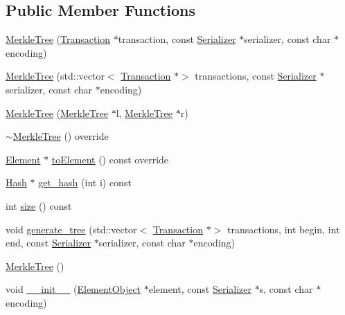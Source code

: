 \subsection*{Public Member Functions}
\begin{DoxyCompactItemize}
\item 
\mbox{\hyperlink{classMerkleTree_a257abaf20fa542b29dfdab95294ae578}{Merkle\+Tree}} (\mbox{\hyperlink{classTransaction}{Transaction}} $\ast$transaction, const \mbox{\hyperlink{classSerializer}{Serializer}} $\ast$serializer, const char $\ast$encoding)
\item 
\mbox{\hyperlink{classMerkleTree_abc65d820b1b59f00350b2f4a4bc580bd}{Merkle\+Tree}} (std\+::vector$<$ \mbox{\hyperlink{classTransaction}{Transaction}} $\ast$$>$ transactions, const \mbox{\hyperlink{classSerializer}{Serializer}} $\ast$serializer, const char $\ast$encoding)
\item 
\mbox{\hyperlink{classMerkleTree_a361a5f238249d4893b000560dcabacde}{Merkle\+Tree}} (\mbox{\hyperlink{classMerkleTree}{Merkle\+Tree}} $\ast$l, \mbox{\hyperlink{classMerkleTree}{Merkle\+Tree}} $\ast$r)
\item 
\mbox{\hyperlink{classMerkleTree_a3f27e1251262e736106a9a2fba75f72f}{$\sim$\+Merkle\+Tree}} () override
\item 
\mbox{\hyperlink{classElement}{Element}} $\ast$ \mbox{\hyperlink{classMerkleTree_a4e72819c6cbc49ed8ce092f464711a5f}{to\+Element}} () const override
\item 
\mbox{\hyperlink{classHash}{Hash}} $\ast$ \mbox{\hyperlink{classMerkleTree_a74d741770514ec323521ec6d79d250f2}{get\+\_\+hash}} (int i) const
\item 
int \mbox{\hyperlink{classMerkleTree_aac309360fa4653451af713a8ce9684bd}{size}} () const
\item 
void \mbox{\hyperlink{classMerkleTree_a543fdfd1f1c4ded332cdeae2cd788aac}{generate\+\_\+tree}} (std\+::vector$<$ \mbox{\hyperlink{classTransaction}{Transaction}} $\ast$$>$ transactions, int begin, int end, const \mbox{\hyperlink{classSerializer}{Serializer}} $\ast$serializer, const char $\ast$encoding)
\item 
\mbox{\hyperlink{classMerkleTree_a6e639010fea282326c335403493d38b6}{Merkle\+Tree}} ()
\item 
void \mbox{\hyperlink{classComponent_a28212595f8ee85fe009bd233bc99b2fc}{\+\_\+\+\_\+init\+\_\+\+\_\+}} (\mbox{\hyperlink{classElementObject}{Element\+Object}} $\ast$element, const \mbox{\hyperlink{classSerializer}{Serializer}} $\ast$s, const char $\ast$encoding)
\end{DoxyCompactItemize}
